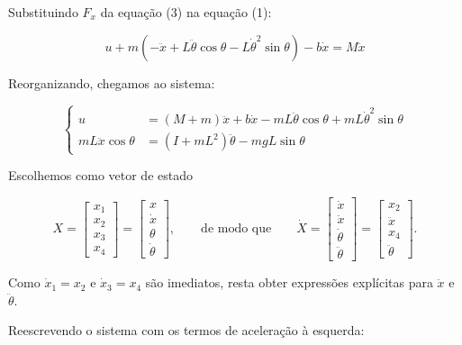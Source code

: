 \documentclass[brazil, 12pt]{article}
\begin{document}
Substituindo $F_x$ da equação (3) na equação (1):

\[
u + m\left(-\ddot{x} + L\ddot{\theta}\cos\theta - L\dot{\theta}^{2}\sin\theta\right) - b\dot{x} = M\ddot{x}
\]

Reorganizando, chegamos ao sistema:

\[
\left\{
\begin{aligned}
u &= (M+m)\ddot{x} + b\dot{x} - mL\ddot{\theta}\cos\theta + mL\dot{\theta}^{2}\sin\theta \\[6pt]
mL\ddot{x}\cos\theta &= \left(I + mL^{2}\right)\ddot{\theta} - mgL\sin\theta
\end{aligned}
\right.
\]

\vspace{0.3cm}


Escolhemos como vetor de estado

\[
X =
\begin{bmatrix}
x_1 \\ x_2 \\ x_3 \\ x_4
\end{bmatrix}
=
\begin{bmatrix}
x \\ \dot{x} \\ \theta \\ \dot{\theta}
\end{bmatrix},
\qquad\text{de modo que}\qquad
\dot{X} =
\begin{bmatrix}
\dot{x} \\ \ddot{x} \\ \dot{\theta} \\ \ddot{\theta}
\end{bmatrix}
=
\begin{bmatrix}
x_2 \\ \ddot{x} \\ x_4 \\ \ddot{\theta}
\end{bmatrix}.
\]

Como $\dot{x}_1 = x_2$ e $\dot{x}_3 = x_4$ são imediatos, resta obter expressões
explícitas para $\ddot{x}$ e $\ddot{\theta}$.


Reescrevendo o sistema com os termos de aceleração à esquerda:
\end{document}
